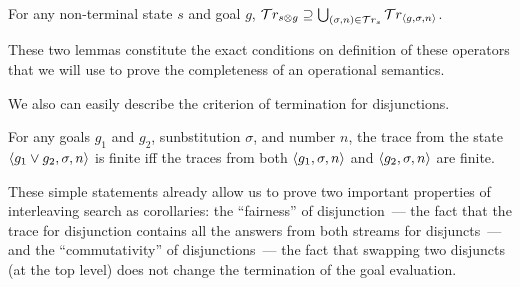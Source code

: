 \begin{lemma}
\label{lem:prod_answers}
For any non-terminal state $s$ and goal $g$,  \mbox{$\mathcal{T}r_{s \otimes g} \supseteq \bigcup_{(\sigma, n) \in \mathcal{T}r_{s}} \mathcal{T}r_{\left<{g, \sigma, n}\right>}$}.
\end{lemma}

These two lemmas constitute the exact conditions on definition of these operators that we will use to prove the completeness of an operational semantics.

We also can easily describe the criterion of termination for disjunctions.

\begin{lemma}
\label{lem:disj_termination}
For any goals $g_1$ and $g_2$, sunbstitution $\sigma$, and number $n$, the trace from the state $\left<{g_1 \vee g_2, \sigma, n}\right>$ is finite iff the traces from both $\left<{g_1, \sigma, n}\right>$ and $\left<{g_2, \sigma, n}\right>$ are finite.
\end{lemma}

These simple statements already allow us to prove two important properties of interleaving search as corollaries: the ``fairness'' of disjunction~--- the fact that the trace for disjunction contains all the answers from both streams for disjuncts~--- and the ``commutativity'' of disjunctions~--- the fact that swapping two disjuncts (at the top level) does not change the termination of the goal evaluation. 

